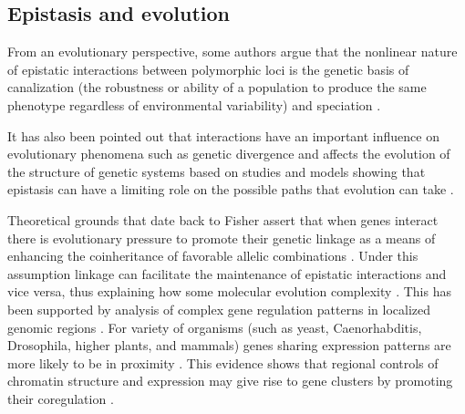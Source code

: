 
\subsection{Epistasis and evolution}

From an evolutionary perspective, some authors argue that the nonlinear nature of epistatic interactions between polymorphic loci is the genetic basis of canalization (the robustness or ability of a population to produce the same phenotype regardless of environmental variability) and speciation \cite{huang2012epistasis}.

It has also been pointed out that interactions have an important influence on evolutionary phenomena such as genetic divergence and affects the evolution of the structure of genetic systems \cite{phillips2008epistasis} based on studies and models showing that epistasis can have a limiting role on the possible paths that evolution can take \cite{miller2006direct}.

Theoretical grounds that date back to Fisher assert that when genes interact there is evolutionary pressure to promote their genetic linkage as a means of enhancing the coinheritance of favorable allelic combinations \cite{fisher1958genetical}.
Under this assumption linkage can facilitate the maintenance of epistatic interactions and vice versa, thus explaining how some molecular evolution complexity \cite{phillips2008epistasis}.
This has been supported by analysis of complex gene regulation patterns in localized genomic regions \cite{birney2007identification}.
For variety of organisms (such as yeast, Caenorhabditis, Drosophila, higher plants, and mammals) genes sharing expression patterns are more likely to be in proximity \cite{hurst2004evolutionary}.
This evidence shows that regional controls of chromatin structure and expression may give rise to gene clusters by promoting their coregulation \cite{petkov2005evidence}.

